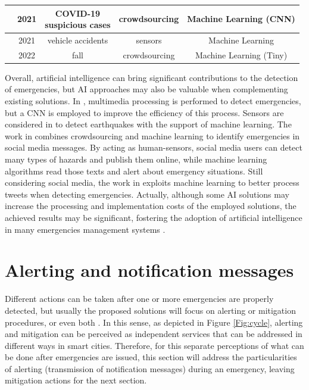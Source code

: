\begin{refsection}
\begin{table}
{\begin{tabular}{c|c|c|c|c}
    \hline
    \citeauthor{MachineCovidVoice} & 2021 & \makecell{COVID-19\\suspicious cases} & crowdsourcing & Machine Learning (CNN) \\
    
    \hline
    \citeauthor{MachineVehicleAccident} & 2021 & vehicle accidents & sensors & Machine Learning \\
    
    \hline
    \citeauthor{TinyMachineFall} & 2022 & fall & crowdsourcing & Machine Learning (Tiny) \\
  \end{tabular}
  }
\end{table}

Overall, artificial intelligence can bring significant contributions to the detection of emergencies, but AI approaches may also be valuable when complementing existing solutions. In \cite{visualdataEmergency4}, multimedia processing is performed to detect emergencies, but a CNN is employed to improve the efficiency of this process. Sensors are considered in \cite{iotEarthquake2} to detect earthquakes with the support of machine learning. The work in \cite{Alkhatib2019771} combines crowdsourcing and machine learning to identify emergencies in social media messages. By acting as human-sensors, social media users can detect many types of hazards and publish them online, while machine learning algorithms read those texts and alert about emergency situations. Still considering social media, the work in \cite{twitter3} exploits machine learning to better process tweets when detecting emergencies. Actually, although some AI solutions may increase the processing and implementation costs of the employed solutions, the achieved results may be significant, fostering the adoption of artificial intelligence in many emergencies management systems \cite{surveyAI1,surveyAI2,iaHumanCentered}.

\section{Alerting and notification messages}\label{sec5}

Different actions can be taken after one or more emergencies are properly detected, but usually the proposed solutions will focus on alerting or mitigation procedures, or even both \cite{architecture1,emergenciesmetric2}. In this sense, as depicted in Figure \ref{Fig:cycle}, alerting and mitigation can be perceived as independent services that can be addressed in different ways in smart cities. Therefore, for this separate perceptions of what can be done after emergencies are issued, this section will address the particularities of alerting (transmission of notification messages) during an emergency, leaving mitigation actions for the next section. 


\end{refsection}
